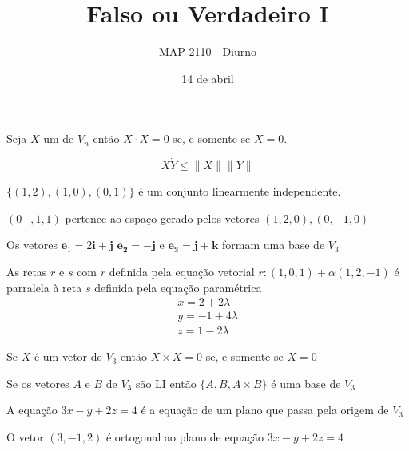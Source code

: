 \documentclass{beamer}
\title[]{Falso ou Verdadeiro I}
\author{MAP 2110 - Diurno}
\institute{IME USP}
\date{14 de abril}
\begin{document}
\begin{frame}
  \titlepage
\end{frame}


\begin{frame}{}
 Seja $X$ um  de $V_n$ então $X\cdot X =0$ se, e somente se $X=0$.
\end{frame}

\begin{frame}{}
$$X\dot Y \leq \|X\|\|Y\|$$
\end{frame}

\begin{frame}
  $\{ (1,2), (1,0), (0,1)\}$ é um conjunto linearmente independente.
\end{frame}

\begin{frame}{}

  $(0-,1, 1)$ pertence ao espaço gerado pelos vetores ${(1,2,0), (0,-1, 0)}$

\end{frame}

\begin{frame}
  Os vetores $\mathbf{e}_1 = 2\mathbf{i}+\mathbf{j}$ $\mathbf{e_2}= -\mathbf{j}$ e
  $\mathbf{e_3}=\mathbf{j}+\mathbf{k}$ formam uma base de $V_3$
\end{frame}

\begin{frame}
  As retas $r$ e $s$
  com $r$ definida pela equação vetorial  $r: (1,0,1) + \alpha (1,2,-1)$ é parralela 
  à reta $s$ definida pela equação paramétrica
  \begin{gather*}
    x= 2 + 2\lambda \\
    y= -1 + 4\lambda \\
    z= 1  - 2\lambda
  \end{gather*}
\end{frame}


\begin{frame}{}
  Se $X$ é um vetor de $V_3$ então $X\times X = 0$ se, e somente se $X=0$
\end{frame}

\begin{frame}{}
 Se os vetores $A$ e $B$ de $V_3$ são LI então $\{A,B,A\times B\}$ é uma 
 base de $V_3$
\end{frame}

\begin{frame}
 A equação $3x-y+ 2z =4$ é a equação de um plano que passa pela origem de $V_3$
\end{frame}

\begin{frame}
  O vetor $(3,-1,2)$ é ortogonal ao plano de equação $3x-y+ 2z =4$
\end{frame}
\end{document}
